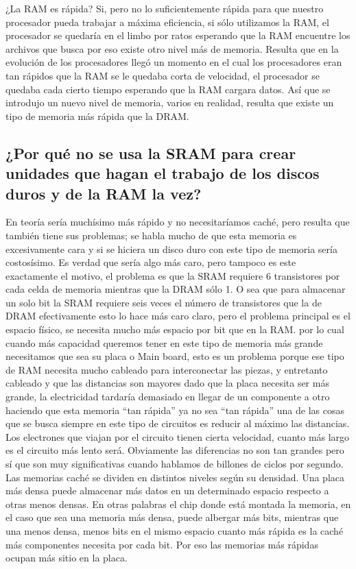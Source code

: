 \documentclass{article}
\begin{document}
¿La RAM es rápida? Si, pero no lo suficientemente rápida para que nuestro procesador pueda trabajar a máxima eficiencia, si sólo utilizamos la RAM, el procesador se quedaría en el limbo por ratos esperando que la RAM encuentre los archivos que busca por eso existe otro nivel más de memoria. Resulta que en la evolución de los procesadores llegó un momento en el cual los procesadores eran tan rápidos que la RAM se le quedaba corta de velocidad, el procesador se quedaba cada cierto tiempo esperando que la RAM cargara datos. Así que se introdujo un nuevo nivel de memoria, varios en realidad, resulta que existe un tipo de memoria más rápida que la DRAM.

\subsection{¿Por qué no se usa la SRAM para crear unidades que hagan el trabajo de los discos duros y de la RAM la vez?}

En teoría sería muchísimo más rápido y no necesitaríamos caché, pero resulta que también tiene sus problemas; se habla mucho de que esta memoria es excesivamente cara y si se hiciera un disco duro con este tipo de memoria sería costosísimo. Es verdad que sería algo más caro, pero tampoco es este exactamente el motivo, el problema es que la SRAM requiere 6 transistores por cada celda de memoria mientras que la DRAM sólo 1. O sea que para almacenar un solo bit la SRAM requiere seis veces el número de transistores que la de DRAM efectivamente esto lo hace más caro claro, pero el problema principal es el espacio físico, se necesita mucho más espacio por bit que en la RAM. por lo cual cuando más capacidad queremos tener en este tipo de memoria más grande necesitamos que sea su placa o Main board, esto es un problema porque ese tipo de RAM necesita mucho cableado para interconectar las piezas, y entretanto cableado y que las distancias son mayores dado que la placa necesita ser más grande, la electricidad tardaría demasiado en llegar de un componente a otro haciendo que esta memoria “tan rápida” ya no sea “tan rápida” una de las cosas que se busca siempre en este tipo de circuitos es reducir al máximo las distancias. Los electrones que viajan por el circuito tienen cierta velocidad, cuanto más largo es el circuito más lento será. Obviamente las diferencias no son tan grandes pero sí que son muy significativas cuando hablamos de billones de ciclos por segundo.\\

Las memorias caché se dividen en distintos niveles según su densidad. Una placa más densa puede almacenar más datos en un determinado espacio respecto a otras menos densas. En otras palabras
el chip donde está montada la memoria, en el caso que sea una memoria más densa, puede albergar más bits, mientras que una menos densa, menos bits en el mismo espacio cuanto más rápida es la caché más componentes necesita por cada bit. Por eso las memorias más rápidas ocupan más sitio en la placa.\\ 
\end{document}
